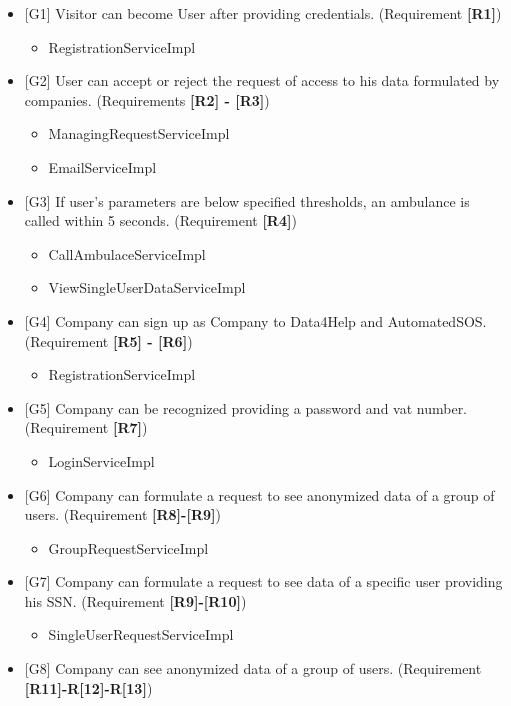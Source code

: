 \documentclass{article}
\begin{document}
\begin{itemize}
	\item {[G1]} Visitor can become User after providing credentials. (Requirement \textbf{[R1]})
	\begin{itemize}
	\item RegistrationServiceImpl
	\end{itemize}
	\item {[G2]} User can accept or reject the request of access to his data formulated by companies. (Requirements \textbf{[R2] - [R3]})
	\begin{itemize}
	\item ManagingRequestServiceImpl
	\item EmailServiceImpl
	\end{itemize}
	\item {[G3]} If user's parameters are below specified thresholds, an ambulance is called within 5 seconds. (Requirement \textbf{[R4]}) 
	\begin{itemize}
	\item CallAmbulaceServiceImpl
	\item ViewSingleUserDataServiceImpl
	\end{itemize}
	\item {[G4]} Company can sign up as Company to Data4Help and AutomatedSOS. (Requirement \textbf{[R5] - [R6]})
	\begin{itemize}
	\item RegistrationServiceImpl
	\end{itemize}
	\item {[G5]} Company can be recognized providing a password and vat number. (Requirement \textbf{[R7]})
	\begin{itemize}
	\item LoginServiceImpl
	\end{itemize}
	\item {[G6]} Company can formulate a request to see anonymized data of a group of users. (Requirement \textbf{[R8]-[R9]})
	\begin{itemize}
	\item GroupRequestServiceImpl
	\end{itemize}
	\item {[G7]} Company can formulate a request to see data of a specific user providing his SSN. (Requirement \textbf{[R9]-[R10]})
	\begin{itemize}
	\item SingleUserRequestServiceImpl
	\end{itemize}
	\item {[G8]} Company can see anonymized data of a group of users. (Requirement \textbf{[R11]-R[12]-R[13]})

\end{itemize}
\end{document}
